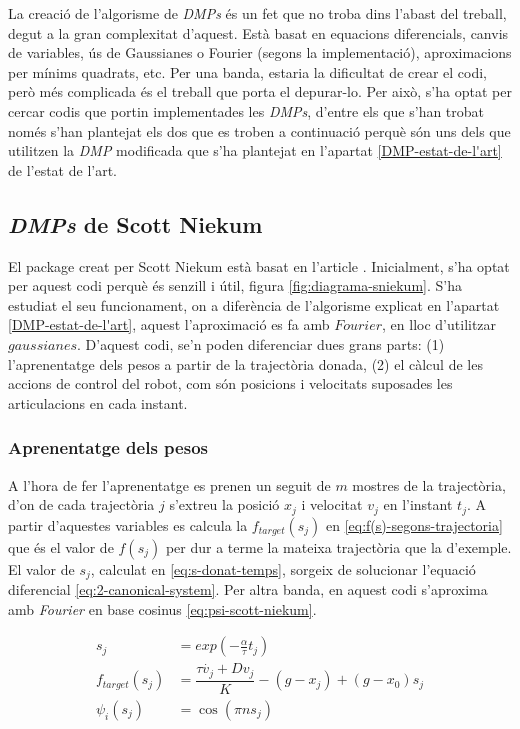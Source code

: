 \documentclass[12pt,a4paper,final,twoside]{report}
\begin{document}
La creació de l'algorisme de \textit{DMPs} és un fet que no troba dins l'abast del treball, degut a la gran complexitat d'aquest. Està basat en equacions diferencials, canvis de variables, ús de Gaussianes o Fourier (segons la implementació), aproximacions per mínims quadrats, etc. Per una banda, estaria la dificultat de crear el codi, però més complicada és el treball que porta el depurar-lo. Per això, s'ha optat per cercar codis que portin implementades les \textit{DMPs}, d'entre els que s'han trobat només s'han plantejat els dos que es troben a continuació perquè són uns dels que utilitzen la \textit{DMP} modificada que s'ha plantejat en l'apartat \ref{DMP-estat-de-l'art} de l'estat de l'art.

\subsection{\textit{DMPs} de Scott Niekum}

El package creat per Scott Niekum està basat en l'article \cite{Pastor2009}. Inicialment, s'ha optat per aquest codi perquè és senzill i útil, figura \ref{fig:diagrama-sniekum}. S'ha estudiat el seu funcionament, on a diferència de l'algorisme explicat en l'apartat \ref{DMP-estat-de-l'art}, aquest l'aproximació es fa amb $Fourier$, en lloc d'utilitzar $gaussianes$. D'aquest codi, se'n poden diferenciar dues grans parts: (1) l'aprenentatge dels pesos a partir de la trajectòria donada, (2) el càlcul de les accions de control del robot, com són posicions i velocitats suposades les articulacions en cada instant.

\subsubsection{Aprenentatge dels pesos}

A l'hora de fer l'aprenentatge es prenen un seguit de $m$ mostres de la trajectòria, d'on de cada trajectòria $j$ s'extreu la posició $x_j$ i velocitat $v_j$ en l'instant $t_j$. A partir d'aquestes variables es calcula la $f_{target}(s_j)$ en \eqref{eq:f(s)-segons-trajectoria} que és el valor de $f(s_j)$ per dur a terme la mateixa trajectòria que la d'exemple. El valor de $s_j$, calculat en \eqref{eq:s-donat-temps}, sorgeix de solucionar l'equació diferencial \eqref{eq:2-canonical-system}. Per altra banda, en aquest codi s'aproxima amb \textit{Fourier} en base cosinus \eqref{eq:psi-scott-niekum}. 

\begin{align}
s_j &= exp(-\frac{\alpha}{\tau}  t_j)\label{eq:s-donat-temps}\\
f_{target}(s_j) &= \dfrac{\tau \dot{v_j} + D v_j}{K} - (g - x_j) + (g - x_0)s_j \label{eq:f(s)-segons-trajectoria} \\
\psi_i(s_j) &= \cos(\pi n s_j)\label{eq:psi-scott-niekum}
\end{align}
\end{document}
